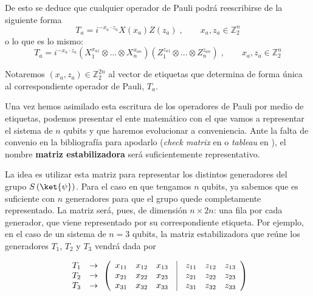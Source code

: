 \documentclass[11pt,a4paper,twoside,pdf]{article}
\numberwithin{equation}{section}
\begin{document}
		De esto se deduce que cualquier operador de Pauli podrá reescribirse de la siguiente forma
		\begin{equation}\label{eq: Operador Pauli etiqueta 1}
			T_a = i^{- x_a \cdot z_a} X(x_a) Z(z_a) \; , \qquad x_a, z_a \in \mathbb{Z}_2^n  
		\end{equation}
		o lo que es lo mismo:
		\begin{equation}\label{eq: Operador Pauli etiqueta 2}
			T_a = i^{- x_a \cdot z_a} \left( X_1^{x_{a1}} \otimes ... \otimes X_n^{x_{an}}\right) 
			\left( Z_1^{z_{a1}} \otimes ... \otimes Z_n^{z_{an}}\right) \; , \qquad x_a, z_a
			\in \mathbb{Z}_2^n  
		\end{equation}
		
		Notaremos $(x_a,z_a) \in \mathbb{Z}_2^{2n}$ al vector de etiquetas que determina de forma única al correspondiente operador de Pauli, $T_a$.
		
		Una vez hemos asimilado esta escritura de los operadores de Pauli por medio de etiquetas, podemos presentar el ente matemático con el que vamos a representar el sistema de $n$ qubits y que haremos evolucionar a conveniencia. Ante la falta de convenio en la bibliografía para apodarlo (\textit{check matrix} en \cite{NielsenChuang} o \textit{tableau} en \cite{Aaronson}), el nombre \textbf{matriz estabilizadora} será suficientemente representativo.
		
		La idea es utilizar esta matriz para representar los distintos generadores del grupo $S\left( \ket{\psi}\right)$. Para el caso en que tengamos $n$ qubits, ya sabemos que es suficiente con $n$ generadores para que el grupo quede completamente representado. La matriz será, pues, de dimensión $n\times 2n$: una fila por cada generador, que viene representado por su correspondiente etiqueta. Por ejemplo, en el caso de un sistema de $n=3$ qubits, la matriz estabilizadora que reúne los generadores $T_1$, $T_2$ y $T_3$ vendrá dada por
	
			\begin{equation} \label{eq: matriz estabilizadora 1}
			\begin{array}{cc}
			T_1 &\rightarrow \\ T_2 &\rightarrow \\ T_3 &\rightarrow
			\end{array}
			\left(\begin{array}{ccccccc}
			x_{11}  	  & x_{12}   &  x_{13} 	      & \vline & z_{11}       &  z_{12} &  z_{13}    \\
			x_{21}  	 & x_{22}  &  x_{23} 	   	 & \vline & z_{21}       &  z_{22} &  z_{23}  	  \\
			x_{31}  	 & x_{32}  &  x_{33} 	  	& \vline & z_{31}       &  z_{32} &  z_{33}\\ 
			\end{array}\right)		
			\end{equation}
\end{document}
